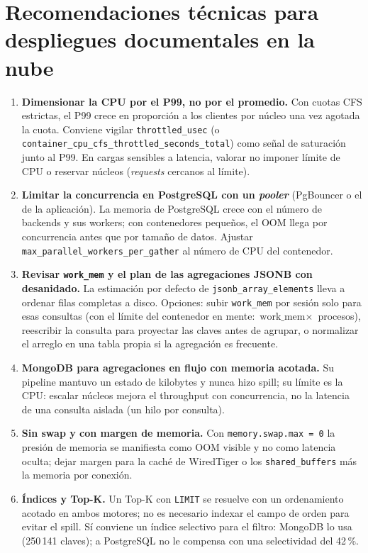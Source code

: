 \documentclass[11pt,letterpaper]{article}
\begin{document}
\section{Recomendaciones técnicas para despliegues documentales en la nube}
\label{sec:recomendaciones}
\begin{enumerate}
  \item \textbf{Dimensionar la CPU por el P99, no por el promedio.} Con cuotas CFS estrictas, el
        P99 crece en proporción a los clientes por núcleo una vez agotada la cuota. Conviene
        vigilar \texttt{throttled\_usec} (o \texttt{container\_cpu\_cfs\_throttled\_seconds\_total})
        como señal de saturación junto al P99. En cargas sensibles a latencia, valorar no imponer
        límite de CPU o reservar núcleos (\emph{requests} cercanos al límite).
  \item \textbf{Limitar la concurrencia en PostgreSQL con un \emph{pooler}} (PgBouncer o el de la
        aplicación). La memoria de PostgreSQL crece con el número de backends y sus workers; con
        contenedores pequeños, el OOM llega por concurrencia antes que por tamaño de datos.
        Ajustar \texttt{max\_parallel\_workers\_per\_gather} al número de CPU del contenedor.
  \item \textbf{Revisar \texttt{work\_mem} y el plan de las agregaciones JSONB con desanidado.}
        La estimación por defecto de \texttt{jsonb\_array\_elements} lleva a ordenar filas
        completas a disco. Opciones: subir \texttt{work\_mem} por sesión solo para esas
        consultas (con el límite del contenedor en mente: $\text{work\_mem}\times$ procesos),
        reescribir la consulta para proyectar las claves antes de agrupar, o normalizar el arreglo
        en una tabla propia si la agregación es frecuente.
  \item \textbf{MongoDB para agregaciones en flujo con memoria acotada.} Su pipeline mantuvo un
        estado de kilobytes y nunca hizo spill; su límite es la CPU: escalar núcleos mejora el
        throughput con concurrencia, no la latencia de una consulta aislada (un hilo por consulta).
  \item \textbf{Sin swap y con margen de memoria.} Con \texttt{memory.swap.max = 0} la presión de
        memoria se manifiesta como OOM visible y no como latencia oculta; dejar margen para la
        caché de WiredTiger o los \texttt{shared\_buffers} más la memoria por conexión.
  \item \textbf{Índices y Top-K.} Un Top-K con \texttt{LIMIT} se resuelve con un ordenamiento
        acotado en ambos motores; no es necesario indexar el campo de orden para evitar el spill.
        Sí conviene un índice selectivo para el filtro: MongoDB lo usa (250\,141 claves); a
        PostgreSQL no le compensa con una selectividad del 42\,\%.
\end{enumerate}
\end{document}
